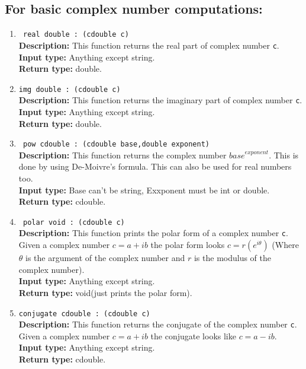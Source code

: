 \documentclass[12pt]{article}
\begin{document}
\subsection{For basic complex number computations:}
\begin{enumerate}
    \item \texttt{ real double : (cdouble c)} \\
    \textbf{Description:} This function returns the real part of complex number \texttt{c}.\\
    \textbf{Input type:} Anything except string. \\
    \textbf{Return type:} double.
    \item \texttt{img double : (cdouble c)} \\
    \textbf{Description:} This function returns the imaginary part of complex number \texttt{c}.\\
    \textbf{Input type:} Anything except string. \\
    \textbf{Return type:} double.
    \item \texttt{ pow cdouble : (cdouble base,double exponent)} \\
    \textbf{Description:} This function returns the complex number ${base}^{exponent}$. This is done by using De-Moivre's formula. This can also be used for real numbers too.\\
    \textbf{Input type:} Base can't be string, Exxponent must be int or double. \\
    \textbf{Return type:} cdouble.
    \item \texttt{ polar void : (cdouble c)} \\
    \textbf{Description:} This function prints the polar form of a complex number \texttt{c}. Given a complex number $c=a+ib$ the polar form looks $c=r(e^{i \theta })$ (Where $\theta$ is the argument of the complex number and $r$ is the modulus of the complex number).\\
    \textbf{Input type:} Anything except string. \\
    \textbf{Return type:} void(just prints the polar form).
    \item \texttt{conjugate cdouble : (cdouble c)} \\ 
    \textbf{Description:} This function returns the conjugate of the complex number \texttt{c}. Given a complex number $c=a+ib$ the conjugate looks like $c=a-ib$.\\
    \textbf{Input type:} Anything except string. \\
    \textbf{Return type:} cdouble.

\end{enumerate}
\end{document}
